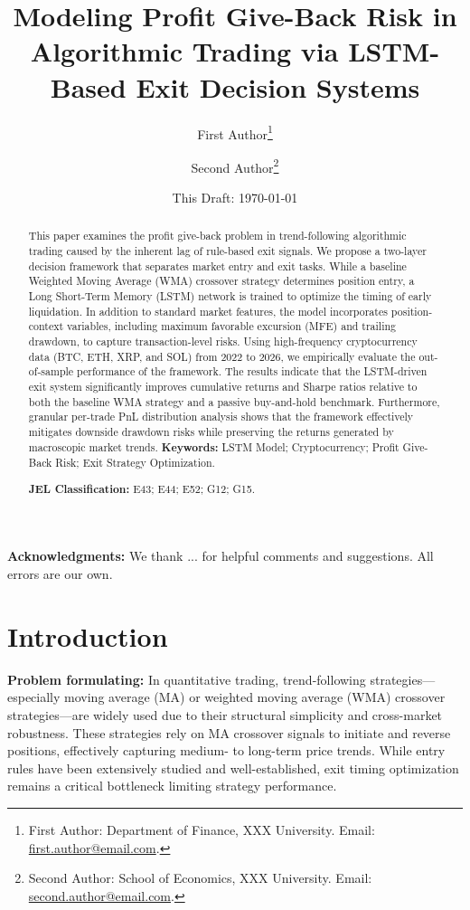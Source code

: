 \documentclass[12pt]{article}
\title{\textbf{Modeling Profit Give-Back Risk in Algorithmic Trading via LSTM-Based Exit Decision Systems}}
\author{
First Author\thanks{
First Author: Department of Finance, XXX University.
Email: \href{mailto:first.author@email.com}{first.author@email.com}.
}
\and
Second Author\thanks{
Second Author: School of Economics, XXX University.
Email: \href{mailto:second.author@email.com}{second.author@email.com}.
}
}
\date{
This Draft: \today
}
\begin{document}
\maketitle

\begin{abstract}
\noindent
This paper examines the profit give-back problem in trend-following algorithmic trading caused by the inherent lag of rule-based exit signals. We propose a two-layer decision framework that separates market entry and exit tasks. While a baseline Weighted Moving Average (WMA) crossover strategy determines position entry, a Long Short-Term Memory (LSTM) network is trained to optimize the timing of early liquidation. In addition to standard market features, the model incorporates position-context variables, including maximum favorable excursion (MFE) and trailing drawdown, to capture transaction-level risks. Using high-frequency cryptocurrency data (BTC, ETH, XRP, and SOL) from 2022 to 2026, we empirically evaluate the out-of-sample performance of the framework. The results indicate that the LSTM-driven exit system significantly improves cumulative returns and Sharpe ratios relative to both the baseline WMA strategy and a passive buy-and-hold benchmark. Furthermore, granular per-trade PnL distribution analysis shows that the framework effectively mitigates downside drawdown risks while preserving the returns generated by macroscopic market trends.
\vspace{0.5em}
\noindent
\textbf{Keywords:} LSTM Model; Cryptocurrency; Profit Give-Back Risk; Exit Strategy Optimization.

\vspace{0.5em}
\noindent
\textbf{JEL Classification:} E43; E44; E52; G12; G15.
\end{abstract}

\vspace{1em}

\noindent
\textbf{Acknowledgments:}
We thank ... for helpful comments and suggestions. All errors are our own.

\newpage

\section{Introduction}\label{sec:introduction}

\textbf{Problem formulating:} In quantitative trading, trend-following strategies—especially moving average (MA) or weighted moving average (WMA) crossover strategies—are widely used due to their structural simplicity and cross-market robustness. These strategies rely on MA crossover signals to initiate and reverse positions, effectively capturing medium- to long-term price trends. While entry rules have been extensively studied and well-established, exit timing optimization remains a critical bottleneck limiting strategy performance.
\end{document}
